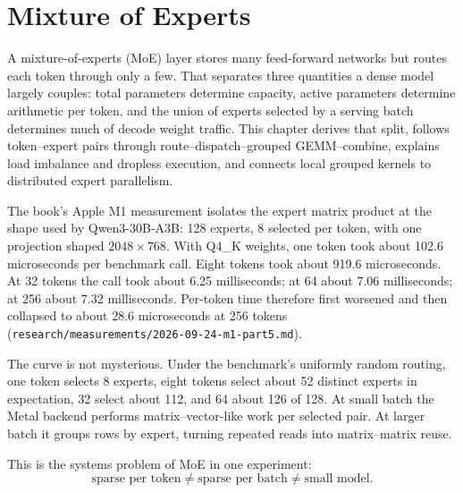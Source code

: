\chapter{Mixture of Experts}\label{ch:mixture-of-experts}

\begin{ChapterIntent}
A mixture-of-experts (MoE) layer stores many feed-forward networks but routes each token
through only a few. That separates three quantities a dense model largely couples:
total parameters determine capacity, active parameters determine arithmetic per token,
and the union of experts selected by a serving batch determines much of decode weight
traffic. This chapter derives that split, follows token--expert pairs through
route--dispatch--grouped GEMM--combine, explains load imbalance and dropless execution,
and connects local grouped kernels to distributed expert parallelism.
\end{ChapterIntent}


The book's Apple M1 measurement isolates the expert matrix product at the shape used by
Qwen3-30B-A3B: 128 experts, 8 selected per token, with one projection shaped
$2048\times768$. With Q4\_K weights, one token took about 102.6 microseconds per
benchmark call. Eight tokens took about 919.6 microseconds. At 32 tokens the call took
about 6.25 milliseconds; at 64 about 7.06 milliseconds; at 256 about 7.32 milliseconds.
Per-token time therefore first worsened and then collapsed to about 28.6 microseconds
at 256 tokens (\texttt{research/measurements/2026-09-24-m1-part5.md}).

The curve is not mysterious. Under the benchmark's uniformly random routing, one token
selects 8 experts, eight tokens select about 52 distinct experts in expectation, 32
select about 112, and 64 about 126 of 128. At small batch the Metal backend performs
matrix--vector-like work per selected pair. At larger batch it groups rows by expert,
turning repeated reads into matrix--matrix reuse.

This is the systems problem of MoE in one experiment:
\[
\boxed{\text{sparse per token}\neq\text{sparse per batch}\neq\text{small model}.}
\]



